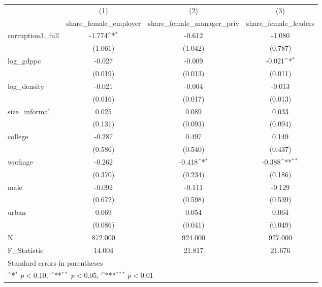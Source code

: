 {
\def\sym#1{\ifmmode^{#1}\else\(^{#1}\)\fi}
\begin{tabular}{l*{3}{c}}
\hline\hline
            &\multicolumn{1}{c}{(1)}&\multicolumn{1}{c}{(2)}&\multicolumn{1}{c}{(3)}\\
            &\multicolumn{1}{c}{share\_female\_employer}&\multicolumn{1}{c}{share\_female\_manager\_priv}&\multicolumn{1}{c}{share\_female\_leaders}\\
\hline
corruption3\_full&      -1.774\sym{*}  &      -0.612         &      -1.080         \\
            &     (1.061)         &     (1.042)         &     (0.787)         \\
[1em]
log\_gdppc   &      -0.027         &      -0.009         &      -0.021\sym{*}  \\
            &     (0.019)         &     (0.013)         &     (0.011)         \\
[1em]
log\_density &      -0.021         &      -0.004         &      -0.013         \\
            &     (0.016)         &     (0.017)         &     (0.013)         \\
[1em]
size\_informal&       0.025         &       0.089         &       0.033         \\
            &     (0.131)         &     (0.093)         &     (0.094)         \\
[1em]
college     &      -0.287         &       0.497         &       0.149         \\
            &     (0.586)         &     (0.540)         &     (0.437)         \\
[1em]
workage     &      -0.262         &      -0.418\sym{*}  &      -0.388\sym{**} \\
            &     (0.370)         &     (0.234)         &     (0.186)         \\
[1em]
male        &      -0.092         &      -0.111         &      -0.129         \\
            &     (0.672)         &     (0.598)         &     (0.539)         \\
[1em]
urban       &       0.069         &       0.054         &       0.064         \\
            &     (0.086)         &     (0.041)         &     (0.049)         \\
\hline
N           &     872.000         &     924.000         &     927.000         \\
F\_Statistic &      14.004         &      21.817         &      21.676         \\
\hline\hline
\multicolumn{4}{l}{\footnotesize Standard errors in parentheses}\\
\multicolumn{4}{l}{\footnotesize \sym{*} \(p<0.10\), \sym{**} \(p<0.05\), \sym{***} \(p<0.01\)}\\
\end{tabular}
}
